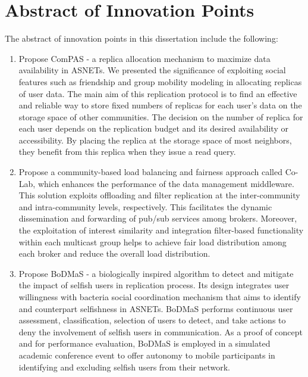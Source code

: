 \chapter*{Abstract of Innovation Points}
The abstract of innovation points in this dissertation include the following:
\begin{enumerate}
    \item {Propose ComPAS - a replica allocation mechanism to maximize data availability in ASNETs. We presented the significance of exploiting social features such as friendship and group mobility modeling in allocating replicas of user data. The main aim of this replication protocol is to find an effective and reliable way to store fixed numbers of replicas for each user's data on the storage space of other communities. The decision on the number of replica for each user depends on the replication budget and its desired availability or accessibility. By placing the replica at the storage space of most neighbors, they benefit from this replica when they issue a read query.}
    \item{Propose a community-based load balancing and fairness approach called Co-Lab, which enhances the performance of the data management middleware. This solution exploits offloading and filter replication at the inter-community and intra-community levels, respectively. This facilitates the dynamic dissemination and forwarding of pub/sub services among brokers. Moreover, the exploitation of interest similarity and integration filter-based functionality within each multicast group helps to achieve fair load distribution among each broker and reduce the overall load distribution.}
    \item{Propose BoDMaS - a biologically inspired algorithm to detect and mitigate the impact of selfish users in replication process. Its design integrates user willingness with bacteria social coordination mechanism that aims to identify and counterpart selfishness in ASNETs. BoDMaS performs continuous user assessment, classification, selection of users to detect, and take actions to deny the involvement of selfish users in communication. As a proof of concept and for performance evaluation, BoDMaS is employed in a simulated academic conference event to offer autonomy to mobile participants in identifying and excluding selfish users from their network.}
\end{enumerate}
